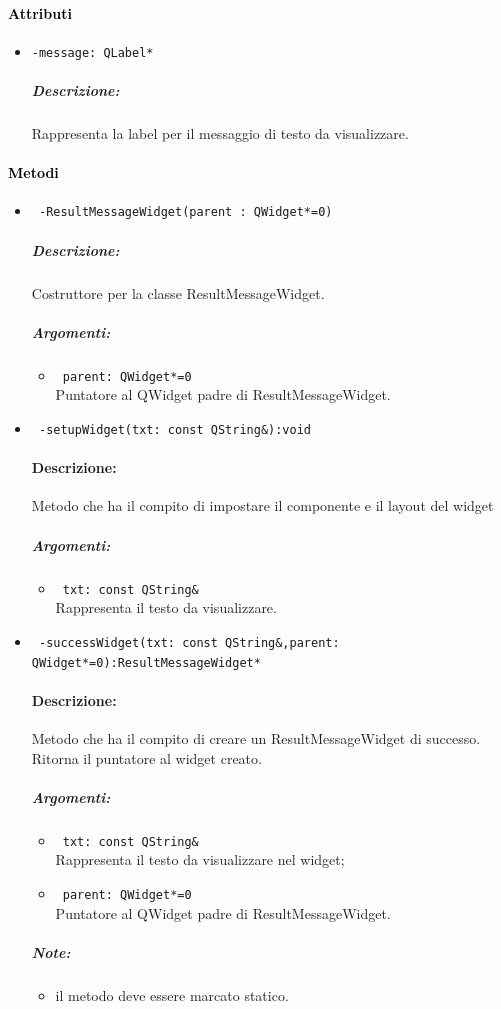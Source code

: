 \paragraph{\textcolor{black}{Attributi\\}}
\begin{itemize}
\item \color{teal}\verb!-message: QLabel*!
\color{black}
\subparagraph{Descrizione:} Rappresenta la label per il messaggio di testo da visualizzare.
\end{itemize}
\paragraph{\textcolor{black}{Metodi\\}}
\begin{itemize}
\item \color{blue}\verb! -ResultMessageWidget(parent : QWidget*=0)!
\color{black}
\subparagraph{Descrizione: }
Costruttore per la classe ResultMessageWidget.
\subparagraph{Argomenti:}
\begin{itemize}
\item  \color{RoyalPurple} \verb! parent: QWidget*=0 ! \\ Puntatore al QWidget padre di ResultMessageWidget.
\end{itemize}
\item \color{blue}\verb! -setupWidget(txt: const QString&):void!
\color{black}
\paragraph{Descrizione: }Metodo che ha il compito di impostare il componente e il layout del widget
\subparagraph{Argomenti:}
\begin{itemize}
\item \color{RoyalPurple} \verb! txt: const QString& ! \\ Rappresenta il testo da visualizzare.
\end{itemize}
\item \color{blue}\verb! -successWidget(txt: const QString&,parent: QWidget*=0):ResultMessageWidget*!
\color{black}
\paragraph{Descrizione: }Metodo che ha il compito di creare un ResultMessageWidget di successo. Ritorna il puntatore al widget creato.
\subparagraph{Argomenti:}
\begin{itemize}
\item \color{RoyalPurple} \verb! txt: const QString& ! \\ Rappresenta il testo da visualizzare nel widget;
\item  \color{RoyalPurple} \verb! parent: QWidget*=0 ! \\ Puntatore al QWidget padre di ResultMessageWidget.
\end{itemize}
\subparagraph{Note:}
\begin{itemize}
\item il metodo deve essere marcato statico.
\end{itemize}


\end{itemize}
